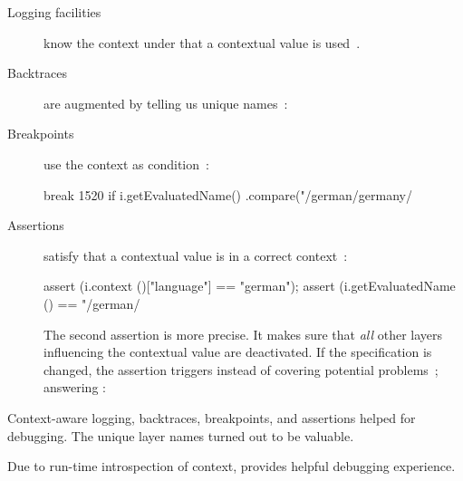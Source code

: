 \begin{description}


\item[Logging facilities] know the context under that a contextual value is used~\cite{raab2014program}.

\item[Backtraces] are augmented by telling us unique names~\cite{raab2014program}:


\item[Breakpoints] use the context as condition~\cite{raab2014program}:

\begin{code}[language=Cpp]
break 1520 if i.getEvaluatedName()
              .compare("/german/germany/%
\end{code}

\item[Assertions] satisfy that a contextual value is in a correct context~\cite{raab2014program}:

\begin{code}[language=Cpp]
assert (i.context ()["language"] == "german");
assert (i.getEvaluatedName () == "/german/%
\end{code}

The second assertion is more precise.
It makes sure that \emph{all} other layers influencing the contextual value are deactivated.
If the specification is changed, the assertion triggers instead of covering potential problems~\cite{raab2014program}; answering :

\end{description}

\rqImplicationDebuggingSupport*


\begin{finding}
Context-aware logging, backtraces, breakpoints, and assertions helped for debugging.
The unique layer names turned out to be valuable.

\begin{implication}
Due to run-time introspection of context, \elektra{} provides helpful debugging experience.
\end{implication}
\end{finding}







